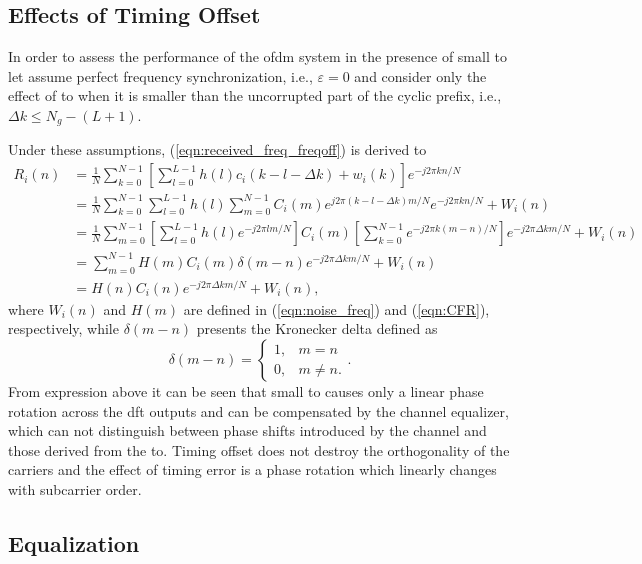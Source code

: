 \subsection{Effects of Timing Offset}

In order to assess the performance of the \gls{ofdm} system in the presence of small \gls{to} let assume perfect frequency synchronization, i.e., $\varepsilon = 0$ and consider only the effect of \gls{to} when it is smaller than the uncorrupted part of the cyclic prefix, i.e., $\Delta k \leq N_g - (L + 1)$.

Under these assumptions, (\ref{eqn:received_freq_freqoff}) is derived to
%
\begin{equation}
\label{eqn:received_time_devel}
\begin{split}
R_i(n)
&=\frac{1}{N} \sum_{k=0}^{N-1} \left[ \sum_{l=0}^{L-1}h(l)c_i(k-l-\Delta k) + w_i(k)\right] e^{-j2\pi k n /N}\\
&=\frac{1}{N} \sum_{k=0}^{N-1} \sum_{l=0}^{L-1}h(l)\sum_{m=0}^{N-1}{C_i(m)e^{j2\pi (k-l -\Delta k)m/N}} e^{-j2\pi k n /N}+W_i(n)\\
&=\frac{1}{N} \sum_{m=0}^{N-1} \left[ \sum_{l=0}^{L-1} h(l)e^{-j2\pi lm/N}\right] C_i(m)\left[ \sum_{k=0}^{N-1} e^{-j2\pi k (m-n)/N}\right]e^{-j2\pi \Delta k m/N} +W_i(n)\\
&=\sum_{m=0}^{N-1} H(m) C_i(m)\delta(m-n)e^{-j2\pi \Delta k m/N} +W_i(n)\\
&= H(n) C_i(n)e^{-j2\pi \Delta k m/N} +W_i(n),
\end{split}
\end{equation}
%
%
where $W_i(n)$ and $H(m)$ are defined in (\ref{eqn:noise_freq}) and (\ref{eqn:CFR}), respectively, while $\delta(m-n)$ presents the Kronecker delta defined as
%
\begin{equation}
\label{eqn:CrDel}
\delta(m-n) = 
\begin{cases}
   1,&m = n\\
   0,&m\neq n.
\end{cases}.
\end{equation}
%
From expression above it can be seen that small \gls{to} causes only a linear phase rotation across the \gls{dft} outputs and can be compensated by the channel equalizer, which can not distinguish between phase shifts introduced by the channel and those derived from the \gls{to}. Timing offset does not destroy the orthogonality of the carriers and the effect of timing error is a phase rotation which linearly changes with subcarrier order.

\subsection{Equalization}\label{ss:equ}

